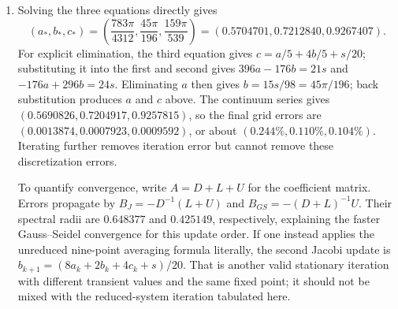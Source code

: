 \begin{enumerate}
\item[(c)] Solving the three equations directly gives
\[
\boxed{(a_*,b_*,c_*)=
\left(\frac{783\pi}{4312},\frac{45\pi}{196},\frac{159\pi}{539}\right)
=(0.5704701,0.7212840,0.9267407).}
\]
For explicit elimination, the third equation gives
$c=a/5+4b/5+s/20$; substituting it into the first and second gives
$396a-176b=21s$ and $-176a+296b=24s$.
Eliminating $a$ then gives $b=15s/98=45\pi/196$; back substitution produces
$a$ and $c$ above.
The continuum series gives $(0.5690826,0.7204917,0.9257815)$, so the final
grid errors are $(0.0013874,0.0007923,0.0009592)$, or about
$(0.244\%,0.110\%,0.104\%)$. Iterating further removes iteration error but
cannot remove these discretization errors.
\begin{center}

\end{center}
To quantify convergence, write $A=D+L+U$ for the coefficient matrix. Errors
propagate by $B_J=-D^{-1}(L+U)$ and $B_{GS}=-(D+L)^{-1}U$.
Their spectral radii are $0.648377$ and $0.425149$, respectively, explaining
the faster Gauss--Seidel convergence for this update order.
If one instead applies the unreduced nine-point averaging formula literally,
the second Jacobi update is
$b_{k+1}=(8a_k+2b_k+4c_k+s)/20$. That is another valid stationary iteration
with different transient values and the same fixed point; it should not be
mixed with the reduced-system iteration tabulated here.
\end{enumerate}
